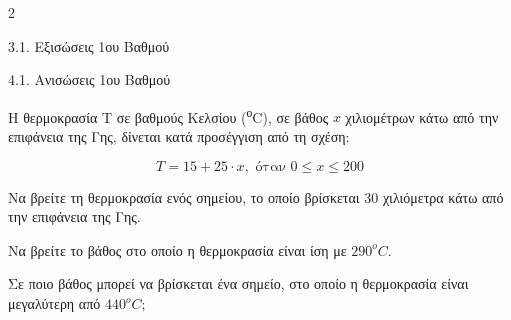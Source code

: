 \begin{ylh}{2}
    \item 3.1. Εξισώσεις 1ου Βαθμού
    \item 4.1. Ανισώσεις 1ου Βαθμού
\end{ylh}
Η θερμοκρασία Τ σε βαθμούς Κελσίου (\textsuperscript{ο}C), σε βάθος $x$ χιλιομέτρων κάτω από την επιφάνεια της Γης, δίνεται κατά προσέγγιση από τη σχέση:

\begin{equation*}T = 15 + 25 \cdot x,\text{  όταν  }0 \leq x \leq 200\end{equation*}

\begin{alist}
\item Να βρείτε τη θερμοκρασία ενός σημείου, το οποίο βρίσκεται 30 χιλιόμετρα κάτω από την επιφάνεια της Γης.
\item Να βρείτε το βάθος στο οποίο η θερμοκρασία είναι ίση με $290^{ο}C.$
\item Σε ποιο βάθος μπορεί να βρίσκεται ένα σημείο, στο οποίο η θερμοκρασία είναι μεγαλύτερη από $440^{ο}C;$
\end{alist}

